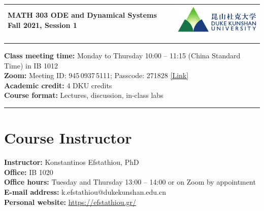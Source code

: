 \documentclass[11pt]{article}
\begin{document}

\begin{tabularx}{\textwidth}{Xm{6cm}}
\arrayrulecolor{dku-blue}\toprule\vspace{6pt}
{\bfseries\color{dku-blue}
 {\Large MATH 303} \newline\newline
 {\huge ODE and Dynamical Systems} \newline\newline
 {\Large Fall 2021, Session 1}} 
& \includegraphics[width=6cm]{dku-logo} \\
\bottomrule
\end{tabularx}

\vspace{1em}

\textcolor{dku-blue}{\rule{\textwidth}{1pt}}

\textbf{Class meeting time:} Monday to Thursday 10:00 – 11:15 (China Standard Time) in IB 1012 \\
\textbf{Zoom:} Meeting ID: 945\,0937\,5111; Passcode: 271828 \href{https://duke.zoom.us/j/94509375111?pwd=OXhnZ2hZZWUwS0JiMmFIYzJsSm4wdz09}{[Link]} \\
\textbf{Academic credit:} 4 DKU credits \\
\textbf{Course format:} Lectures, discussion, in-class labs

\vspace{-1em}\textcolor{dku-blue}{\rule{\textwidth}{1pt}}



\section{Course Instructor}

\textbf{Instructor:} Konstantinos Efstathiou, PhD \\
\textbf{Office:} IB 1020 \\
\textbf{Office hours:} Tuesday and Thursday 13:00 – 14:00 or on Zoom by appointment \\
\textbf{E-mail address:} k.efstathiou@dukekunshan.edu.cn \\
\textbf{Personal website:} \url{https://efstathiou.gr/}
\end{document}
